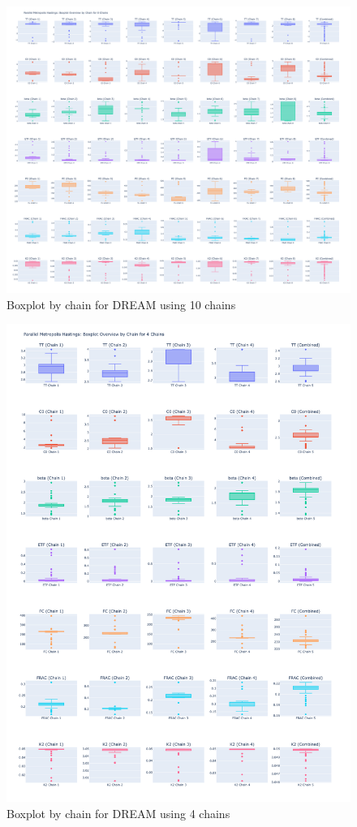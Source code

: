 \begin{figure}[H]
    \centering
    \includegraphics[width=1\textwidth]{figures/dream/boxplot_10.png}
    \captionsetup{width=.8\textwidth}
    \caption{Boxplot by chain for DREAM using 10 chains}
    \label{fig:enter-label}
\end{figure}

\begin{figure}[H]
    \centering
    \includegraphics[width=1\textwidth]{figures/dream/boxplot_4.png}
    \captionsetup{width=.8\textwidth}
    \caption{Boxplot by chain for DREAM using 4 chains}
    \label{fig:enter-label}
\end{figure}

